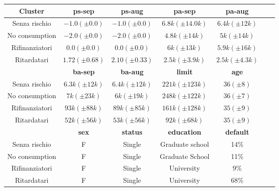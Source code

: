\begin{center}
	
	\begin{tabular}{c|c|c|c|c|c|c}
		\hline
		\textbf{Cluster} & \textbf{ps-sep} 
		& \textbf{ps-aug} & \textbf{pa-sep} 
		& \textbf{pa-aug}\\
		\hline
		Senza rischio & 
		$-1.0 (\pm 0.0)$ & 
		$-1.0 (\pm 0.0)$ &
		$6.8k (\pm 14.0k)$ &
		$6.4k (\pm 12k)$\\
		\hline
		No consumption & 
		$-2.0 (\pm 0.0)$ & 
		$-2.0 (\pm 0.0)$ &
		$4.8k (\pm 14k)$ &
		$5k (\pm 14k)$\\
		\hline
		Rifinanziatori & 
		$0.0 (\pm 0.0)$ & 
		$0.0 (\pm 0.0)$ &
		$6k (\pm 13k)$ &
		$5.9k (\pm 16k)$\\
		\hline
		Ritardatari & 
		$1.72 (\pm 0.68)$ & 
		$2.10 (\pm 0.33)$ &
		$2.5k (\pm 3.9k)$ &
		$2.5k (\pm 4.3k)$\\
		\hline
		& 
		\textbf{ba-sep} & 
		\textbf{ba-aug} & 
		\textbf{limit} & 
		\textbf{age} &\\
		\hline
		Senza rischio & 
		$6.3k (\pm 12k)$ &
		$6.4k (\pm 12k)$ &
		$221k (\pm 123k)$ &
		$36 (\pm 8)$\\
		\hline
		No consumption &
		$7k (\pm 23k)$ &
		$6k (\pm 19k)$ &
		$248k (\pm 122k)$ &
		$36 (\pm 7)$\\
		\hline
		Rifinanziatori &
		$93k (\pm 88k)$ &
		$89k (\pm 85k)$ &
		$161k (\pm 128k)$ &
		$35 (\pm 9)$\\
		\hline
		Ritardatari &
		$52k (\pm 56k)$ &
		$53k (\pm 56k)$ &
		$92k (\pm 68k)$ &
		$35 (\pm 9)$\\
		\hline
		& 
		\textbf{sex} & 
		\textbf{status} & 
		\textbf{education} & 
		\textbf{default}\\
		\hline
		Senza rischio & 
		F &
		Single &
		Graduate school&
		14\%\\
		\hline
		No consumption & 
		F &
		Single &
		Graduate School &
		11\%\\
		\hline
		Rifinanziatori & 
		F &
		Single &
		University&
		9\%\\
		\hline
		Ritardatari & 
		F &
		Single &
		University&
		68\%\\
		\hline
	\end{tabular}
\end{center}


